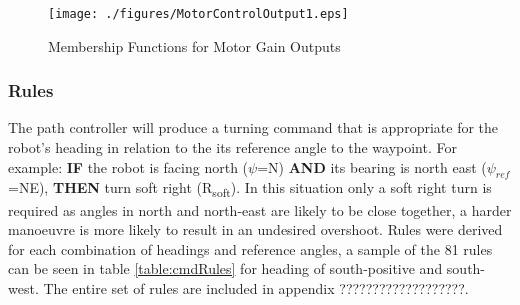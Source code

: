 \documentclass[11pt]{article}
\begin{document}
\begin{figure}[H]
    \centering
\texttt{[image: ./figures/MotorControlOutput1.eps]}
\caption{Membership Functions for Motor Gain Outputs}
\label{fig:motorSets}
\end{figure}

\subsubsection{Rules}
The path controller will produce a turning command that is appropriate for the robot's heading in relation to the its reference angle to the waypoint.
For example: \textbf{IF} the robot is facing north ($\psi$=N) \textbf{AND} its bearing is north east ($\psi_{ref}$=NE), \textbf{THEN} turn soft right (R\textsubscript{soft}).
In this situation only a soft right turn is required as angles in north and north-east are likely to be close together, a harder manoeuvre is more likely to result in an undesired overshoot.
Rules were derived for each combination of headings and reference angles, a sample of the 81 rules can be seen in table \ref{table:cmdRules} for heading of south-positive and south-west.
The entire set of rules are included in appendix ???????????????????.
\end{document}
